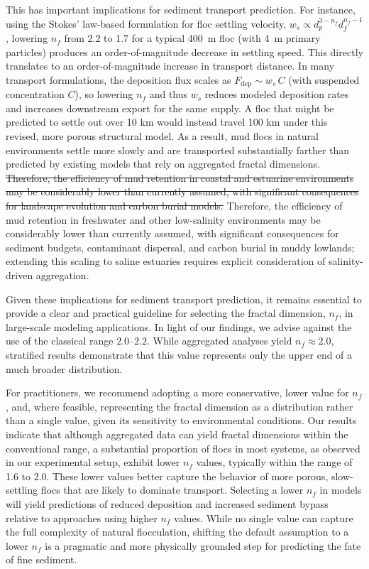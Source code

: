 \documentclass{agujournal2019}
\providecommand{\DIFadd}[1]{{\protect\color{blue}#1}}
\providecommand{\DIFdel}[1]{{\protect\color{red}\sout{#1}}}
\begin{document}
This has important implications for sediment transport prediction. For instance, using the Stokes' law-based formulation for floc settling velocity, \( w_s \propto d_p^{3-n_f} d_f^{n_f-1} \), lowering \( n_f \) from 2.2 to 1.7 for a typical 400~\textmu m floc (with 4~\textmu m primary particles) produces an order-of-magnitude decrease in settling speed. This directly translates to an order-of-magnitude increase in transport distance. \DIFadd{ In many transport formulations, the deposition flux scales as $F_{\mathrm{dep}}\sim w_s\,C$ (with suspended concentration $C$), so lowering $n_f$ and thus $w_s$ reduces modeled deposition rates and increases downstream export for the same supply.} A floc that might be predicted to settle out over 10 km would instead travel 100 km under this revised, more porous structural model. As a result, mud flocs in natural environments settle more slowly and are transported substantially farther than predicted by existing models that rely on aggregated fractal dimensions. \DIFdel{Therefore, the efficiency of mud retention in coastal and estuarine environments may be considerably lower than currently assumed, with significant consequences for landscape evolution and carbon burial models.} \DIFadd{Therefore, the efficiency of mud retention in freshwater and other low-salinity environments may be considerably lower than currently assumed, with significant consequences for sediment budgets, contaminant dispersal, and carbon burial in muddy lowlands; extending this scaling to saline estuaries requires explicit consideration of salinity-driven aggregation.}

Given these implications for sediment transport prediction, it remains essential to provide a clear and practical guideline for selecting the fractal dimension, \( n_f \), in large-scale modeling applications. In light of our findings, we advise against the use of the classical range \( 2.0\text{--}2.2 \). While aggregated analyses yield \( n_f \approx 2.0 \), stratified results demonstrate that this value represents only the upper end of a much broader distribution.

For practitioners, we recommend adopting a more conservative, lower value for \( n_f \), and, where feasible, representing the fractal dimension as a distribution rather than a single value, given its sensitivity to environmental conditions. Our results indicate that although aggregated data can yield fractal dimensions within the conventional range, a substantial proportion of flocs in most systems, as observed in our experimental setup, exhibit lower \( n_f \) values, typically within the range of 1.6 to 2.0. These lower values better capture the behavior of more porous, slow-settling flocs that are likely to dominate transport. Selecting a lower \( n_f \) in models will yield predictions of reduced deposition and increased sediment bypass relative to approaches using higher \( n_f \) values. While no single value can capture the full complexity of natural flocculation, shifting the default assumption to a lower \( n_f \) is a pragmatic and more physically grounded step for predicting the fate of fine sediment.
\end{document}
